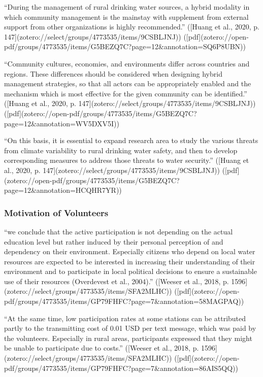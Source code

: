 {“During the management of rural drinking water sources, a hybrid modality in which community management is the mainstay with supplement from external support from other organizations is highly recommended.” ([Huang et al., 2020, p. 147](zotero://select/groups/4773535/items/9CSBLJNJ)) ([pdf](zotero://open-pdf/groups/4773535/items/G5BEZQ7C?page=12&annotation=SQ6P8UBN))

“Community cultures, economies, and environments differ across countries and regions. These differences should be considered when designing hybrid management strategies, so that all actors can be appropriately enabled and the mechanism which is most effective for the given community can be identified.” ([Huang et al., 2020, p. 147](zotero://select/groups/4773535/items/9CSBLJNJ)) ([pdf](zotero://open-pdf/groups/4773535/items/G5BEZQ7C?page=12&annotation=WV5DXV5I))

“On this basis, it is essential to expand research area to study the various threats from climate variability to rural drinking water safety, and then to develop corresponding measures to address those threats to water security.” ([Huang et al., 2020, p. 147](zotero://select/groups/4773535/items/9CSBLJNJ)) ([pdf](zotero://open-pdf/groups/4773535/items/G5BEZQ7C?page=12&annotation=HCQHR7YR))

\subsubsection{Motivation of Volunteers}

“we conclude that the active participation is not depending on the actual education level but rather induced by their personal perception of and dependency on their environment. Especially citizens who depend on local water resources are expected to be interested in increasing their understanding of their environment and to participate in local political decisions to ensure a sustainable use of their resources (Overdevest et al., 2004).” ([Weeser et al., 2018, p. 1596](zotero://select/groups/4773535/items/SFA2MLHC)) ([pdf](zotero://open-pdf/groups/4773535/items/GP79FHFC?page=7&annotation=58MAGPAQ))

“At the same time, low participation rates at some stations can be attributed partly to the transmitting cost of 0.01 USD per text message, which was paid by the volunteers. Especially in rural areas, participants expressed that they might be unable to participate due to costs.” ([Weeser et al., 2018, p. 1596](zotero://select/groups/4773535/items/SFA2MLHC)) ([pdf](zotero://open-pdf/groups/4773535/items/GP79FHFC?page=7&annotation=86AIS5QQ))

}
